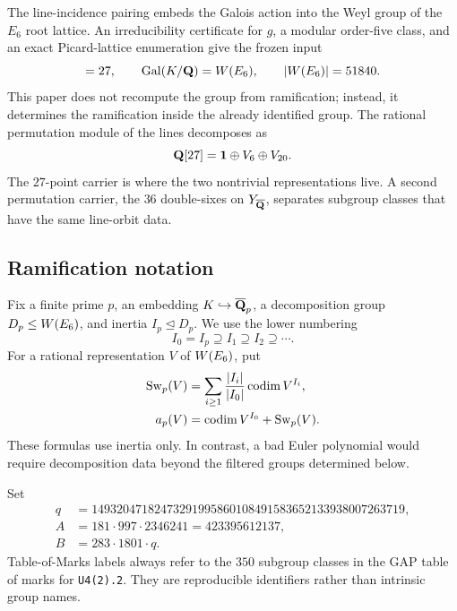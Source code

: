The line-incidence pairing embeds the Galois action into the Weyl group of
the $E_6$ root lattice.  An irreducibility certificate for $g$, a modular
order-five class, and an exact Picard-lattice enumeration give the frozen
input
\begin{equation}
 [E:\Q]=27,\qquad \Gal(K/\Q)=\WE,\qquad |\WE|=51840.
\label{eq:frozen-galois-input}
\end{equation}
This paper does not recompute the group from ramification; instead, it
determines the ramification inside the already identified group.  The
rational permutation module of the lines decomposes as
\begin{equation}
 \mathbf{Q}[27]=\mathbf{1}\oplus V_6\oplus V_{20}.
\label{eq:perm-decomposition}
\end{equation}
The $27$-point carrier is where the two nontrivial representations live.  A
second permutation carrier, the $36$ double-sixes on $Y_{\overline{\mathbf{Q}}}$, separates
subgroup classes that have the same line-orbit data.

\subsection{Ramification notation}

Fix a finite prime $p$, an embedding
$K\hookrightarrow\overline{\mathbf{Q}}_p$, a decomposition group
$D_p\leq W(E_6)$, and inertia $I_p\trianglelefteq D_p$.  We use the lower
numbering
\[
 I_0=I_p\supseteq I_1\supseteq I_2\supseteq\cdots.
\]
For a rational representation $V$ of $W(E_6)$, put
\begin{align}
 \operatorname{Sw}_p(V)&=\sum_{i\geq1}\frac{|I_i|}{|I_0|}
       \operatorname{codim} V^{I_i},\label{eq:swan-definition}\\
 a_p(V)&=\operatorname{codim} V^{I_0}+\operatorname{Sw}_p(V).
\label{eq:artin-definition}
\end{align}
These formulas use inertia only.  In contrast, a bad Euler polynomial would
require decomposition data beyond the filtered groups determined below.

Set
\begin{equation}
\begin{split}
 q&=14932047182473291995860108491583652133938007263719,\\
 A&=181\cdot997\cdot2346241=423395612137,\\
 B&=283\cdot1801\cdot q.
\end{split}
\label{eq:qAB}
\end{equation}
Table-of-Marks labels always refer to the $350$ subgroup classes in the GAP
table of marks for \texttt{U4(2).2}.  They are reproducible identifiers
rather than intrinsic group names.

